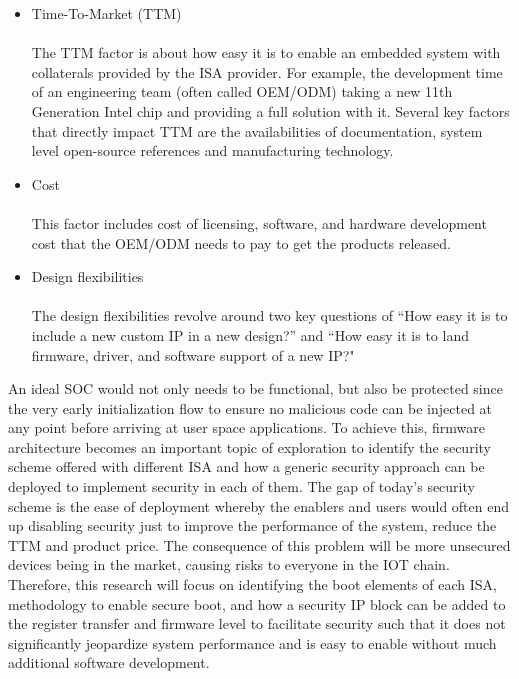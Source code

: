 \documentclass[a4paper,fleqn]{cas-dc}
\begin{document}
\renewcommand\labelitemi{\small$\bullet$} %
\begin{itemize} 
\itemsep=-1pt 		%
\itemindent=-3pt 	%
\item 
Time-To-Market (TTM) \\ \\
The TTM factor is about how easy it is to enable an embedded system with collaterals
provided by the ISA provider. For example, the development time of an engineering team
(often called OEM/ODM) taking a new 11th Generation Intel chip and providing a full
solution with it. Several key factors that directly impact TTM are the availabilities of
documentation, system level open-source references and manufacturing technology.
\\

\item 
Cost \\ \\
This factor includes cost of licensing, software, and hardware development cost that the
OEM/ODM needs to pay to get the products released.
\\

\item 
Design flexibilities \\ \\
The design flexibilities revolve around two key questions of “How easy it is to include a
new custom IP in a new design?” and “How easy it is to land firmware, driver, and
software support of a new IP?"
\end{itemize}

An ideal SOC would not only needs to be functional, but also be protected since the very early
initialization flow to ensure no malicious code can be injected at any point before arriving at
user space applications. To achieve this, firmware architecture becomes an important topic
of exploration to identify the security scheme offered with different ISA and how a generic
security approach can be deployed to implement security in each of them. The gap of today’s
security scheme is the ease of deployment whereby the enablers and users would often end up
disabling security just to improve the performance of the system, reduce the TTM and product price.
The consequence of this problem will be more unsecured devices being in the market,
causing risks to everyone in the IOT chain. Therefore, this research will focus on identifying the
boot elements of each ISA, methodology to enable secure boot, and how a security IP block
can be added to the register transfer and firmware level to facilitate security such that it
does not significantly jeopardize system performance and is easy to enable without much
additional software development.
\end{document}
